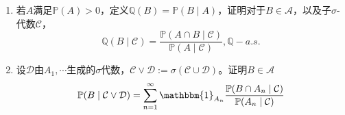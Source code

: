 \documentclass{ctexart}
\begin{document}
\begin{problem}\label{pro:20}
  \begin{enumerate}
    \item 若\(A \)满足\(\mathbb{P}(A)>0 \)，定义\(\mathbb{Q}(B)=\mathbb{P}(B \mid A) \)，证明对于\(B \in \mathcal{A} \)，以及子\(\sigma \)-代数\(\mathcal{C} \)，\[
        \mathbb{Q}(B \mid \mathcal{C})=\frac{\mathbb{P}(A \cap B \mid \mathcal{C})}{\mathbb{P}(A \mid \mathcal{C})}, \mathbb{Q}-a.s.
      \]
    \item 设\(\mathcal{D} \)由\(A_1,\cdots \)生成的\(\sigma \)代数，\(\mathcal{C} \vee \mathcal{D} := \sigma(\mathcal{C} \cup \mathcal{D}) \)。证明\(B \in \mathcal{A} \) \[
        \mathbb{P}(B \mid \mathcal{C} \vee \mathcal{D})=\sum_{n=1}^{\infty} \mathbbm{1}_{A_n} \frac{\mathbb{P}(B \cap A_n \mid \mathcal{C})}{\mathbb{P}(A_n \mid \mathcal{C})}
      \]
  \end{enumerate}
\end{problem}
\end{document}
